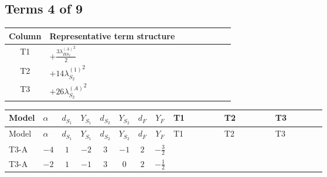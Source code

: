 \documentclass[8pt]{article}
\begin{document}
\begin{landscape}
\subsection*{Terms 4 of 9}
\begin{center}
\begin{tabular}{@{}c >{\raggedright\arraybackslash}p{0.82\linewidth}@{}}
\toprule
Column & Representative term structure \\
\midrule
T1 & \(\displaystyle +\frac{3 {\lambda_{HS_2}^{(A)}}^2}{2}\) \\
\midrule
T2 & \(\displaystyle +14 {\lambda_{S_2}^{(1)}}^2\) \\
\midrule
T3 & \(\displaystyle +26 {\lambda_{S_2}^{(A)}}^2\) \\
\midrule
\bottomrule
\end{tabular}
\end{center}
\smallskip
\tiny
\begin{longtable}{@{}llcccccc >{\raggedright\arraybackslash}p{0.21\linewidth} >{\raggedright\arraybackslash}p{0.21\linewidth} >{\raggedright\arraybackslash}p{0.21\linewidth}@{}}
\toprule
Model & $\alpha$ & $d_{S_1}$ & $Y_{S_1}$ & $d_{S_2}$ & $Y_{S_2}$ & $d_F$ & $Y_F$ & T1 & T2 & T3 \\
\midrule
\endfirsthead
\toprule
Model & $\alpha$ & $d_{S_1}$ & $Y_{S_1}$ & $d_{S_2}$ & $Y_{S_2}$ & $d_F$ & $Y_F$ & T1 & T2 & T3 \\
\midrule
\endhead
T3-A & $-4$ & $1$ & $-2$ & $3$ & $-1$ & $2$ & $-\frac{3}{2}$ & \scriptsize\adjustbox{max width=\linewidth}{$\begin{gathered} +\frac{3 {\lambda_{HS_2}^{(A)}}^2}{2}\end{gathered}$} & \scriptsize\adjustbox{max width=\linewidth}{$\begin{gathered} +14 {\lambda_{S_2}^{(1)}}^2\end{gathered}$} & \scriptsize\adjustbox{max width=\linewidth}{$\begin{gathered} +26 {\lambda_{S_2}^{(A)}}^2\end{gathered}$} \\
\midrule
T3-A & $-2$ & $1$ & $-1$ & $3$ & $0$ & $2$ & $-\frac{1}{2}$ & \scriptsize\adjustbox{max width=\linewidth}{$\begin{gathered} +\frac{3 {\lambda_{HS_2}^{(A)}}^2}{2}\end{gathered}$} & \scriptsize\adjustbox{max width=\linewidth}{$\begin{gathered} +14 {\lambda_{S_2}^{(1)}}^2\end{gathered}$} & \scriptsize\adjustbox{max width=\linewidth}{$\begin{gathered} +26 {\lambda_{S_2}^{(A)}}^2\end{gathered}$} \\

\end{longtable}
\end{landscape}
\end{document}

